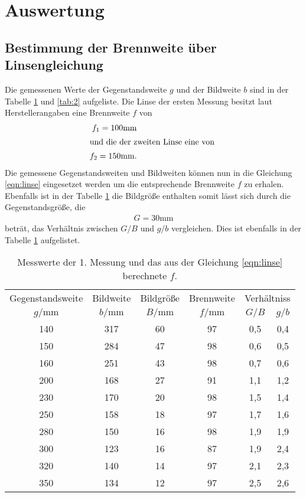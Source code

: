 \section{Auswertung}
\label{sec:Auswertung}
\subsection{Bestimmung der Brennweite über Linsengleichung}
Die gemessenen Werte  der Gegenstandsweite $g$ und der Bildweite $b$  sind
in der Tabelle \ref{tab:1} und \ref{tab:2} aufgeliste.
Die Linse der ersten Messung besitzt laut Herstellerangaben eine Brennweite $f$
von
\begin{align*}
  f_1=100\si{\milli\meter}\\
\intertext{und die der zweiten Linse eine von }
  f_2=150\si{\milli\meter}.
\end{align*}
Die gemessene Gegenstandsweiten und Bildweiten können nun in die Gleichung
\eqref{eqn:linse} eingesetzet werden um die entsprechende Brennweite $f$
zu erhalen. Ebenfalls ist in der Tabelle \ref{tab:1}
die Bildgröße enthalten somit lässt sich durch die Gegenstandsgröße, die
\begin{align*}
  G=30\si{\milli\meter}
\end{align*}
beträt, das Verhältnis zwischen $G/B$ und $g/b$ vergleichen. Dies ist ebenfalls
in der Tabelle \ref{tab:1} aufgelistet.
\begin{table}
  \centering
  \caption{Messwerte der 1. Messung und das aus der Gleichung
   \eqref{eqn:linse} berechnete $f$.}
  \label{tab:1}
  \begin{tabular}{c c c c c c}
  \toprule
  Gegenstandsweite   & Bildweite & Bildgröße & Brennweite & \multicolumn{2}{c}{Verhältniss}\\
  $g/\si{\milli\meter}$ & $b/\si{\milli\meter}$ & $B/\si{\milli\meter}$& $f/\si{\milli\meter}$& $G/B$ &$g/b$\\
  \midrule
  140   &   317  &   60 & 97 &0,5 &0,4 \\
  150   &   284  &   47 & 98 &0,6 &0,5 \\
  160   &   251  &   43 & 98 &0,7 &0,6 \\
  200   &   168  &   27 & 91 &1,1 &1,2 \\
  230   &   170  &   20 & 98 &1,5 &1,4 \\
  250   &   158  &   18 & 97 &1,7 &1,6 \\
  280   &   150  &   16 & 98 &1,9 &1,9 \\
  300   &   123  &   16 & 87 &1,9 &2,4 \\
  320   &   140  &   14 & 97 &2,1 &2,3 \\
  350   &   134  &   12 & 97 &2,5 &2,6 \\
  \bottomrule
 \end{tabular}
\end{table}

